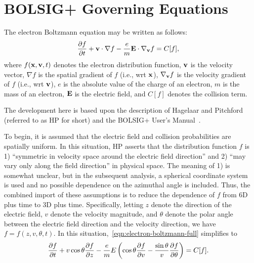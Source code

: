 \section{BOLSIG+ Governing Equations}
The electron Boltzmann equation may be written as follows:
%
\begin{equation}
\frac{\partial f}{\partial t}
+
\mathbf{v} \cdot \nabla f
-
\frac{e}{m} \mathbf{E} \cdot \nabla_{\mathbf{v}} f
=
C[f],
\label{eqn:electron-boltzmann-full}
\end{equation}
%
where $f(\mathbf{x}, \mathbf{v}, t)$ denotes the electron distribution
function, $\mathbf{v}$ is the velocity vector, $\nabla f$ is the spatial
gradient of $f$ (i.e., wrt $\mathbf{x}$), $\nabla_{\mathbf{v}} f$ is the
velocity gradient of $f$ (i.e., wrt $\mathbf{v}$), $e$ is the absolute
value of the charge of an electron, $m$ is the mass of an electron,
$\mathbf{E}$ is the electric field, and $C[f]$ denotes the collision
term.

The development here is based upon the description of Hagelaar and
Pitchford~\cite{} (referred to as HP for short) and the BOLSIG+ User's
Manual~\cite{}.

To begin, it is assumed that the electric field and collision
probabilities are spatially uniform.  In this situation, HP asserts
that the distribution function $f$ is 1) ``symmetric in velocity space
around the electric field direction'' and 2) ``may vary only along the
field direction'' in physical space.  The meaning of 1) is somewhat
unclear, but in the subsequent analysis, a spherical coordinate system
is used and no possible dependence on the azimuthal angle is included.
Thus, the combined import of these assumptions is to reduce the
dependence of $f$ from 6D plus time to 3D plus time.  Specifically,
letting $z$ denote the direction of the electric field, $v$ denote the
velocity magnitude, and $\theta$ denote the polar angle between the
electric field direction and the velocity direction, we have $f = f(z,
v, \theta, t)$.  In this situation,~\ref{eqn:electron-boltzmann-full}
simplifies to
%
\begin{equation}
\frac{\partial f}{\partial t}
+
v \cos \theta \frac{\partial f}{\partial z}
-
\frac{e}{m} E \left( \cos \theta \frac{\partial f}{\partial v} - \frac{\sin \theta}{v} \frac{\partial f}{\partial \theta} \right)
=
C[f].
\label{eqn:electron-boltzmann-reduced}
\end{equation}
%

